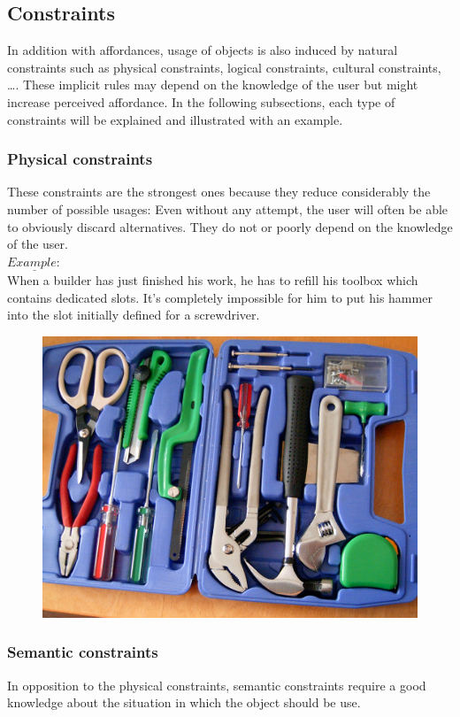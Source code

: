 \documentclass[a4paper,11pt] {article}
\theoremstyle{definition}
\begin{document}
    \subsection{Constraints}
	In addition with affordances, usage of objects is also induced by natural constraints such as physical constraints, logical constraints, cultural constraints, \ldots. These implicit rules may depend on the knowledge of the user but might increase perceived affordance. In the following subsections, each type of constraints will be explained and illustrated with an example.
        \subsubsection{Physical constraints}
        These constraints are the strongest ones because they reduce considerably the number of possible 	usages: Even without any attempt, the user will often be able to obviously discard  alternatives. They do not or poorly depend on the knowledge of the user.\\
        
        $\underline{Example:}$\\
        When a builder has just finished his work, he has to refill his toolbox which contains dedicated 		slots. It's completely impossible for him to put his hammer into the slot initially defined for a screwdriver.
        \begin{figure}[h]
        \centering
        \includegraphics[scale=0.1]{fig-report/toolbox.jpg}
        \end{figure}
        \subsubsection{Semantic constraints}        
       In opposition to the physical constraints, semantic constraints require a good knowledge about the situation in which the object should be use.\\
       
\end{document}
